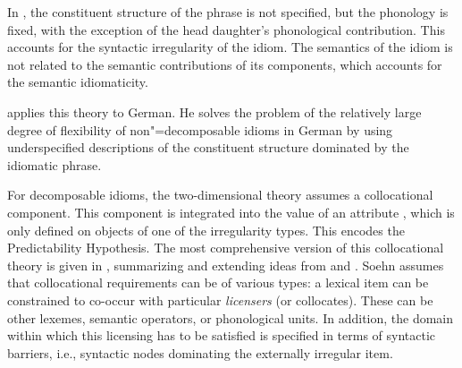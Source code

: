 \documentclass[output=paper
                ,modfonts
                ,nonflat
	        ,collection
	        ,collectionchapter
	        ,collectiontoclongg
 	        ,biblatex
                ,babelshorthands
                ,newtxmath
                ,draftmode
                ,colorlinks, citecolor=brown
]{./langsci/langscibook}
\begin{document}

In , the constituent structure of the phrase is not specified, but the phonology is fixed, with the exception of the head daughter's phonological contribution. This accounts for the syntactic irregularity of the idiom. The semantics of the idiom is not related to the semantic contributions of its components, which accounts for the semantic idiomaticity.

\citet{Soehn2006a} applies this theory to German. He solves the problem of the relatively large degree of flexibility of non"=decomposable idioms in German
by using underspecified descriptions of the constituent structure dominated by the idiomatic phrase.

For decomposable idioms, the two-dimensional theory assumes a collocational component. This component is integrated into the value of an attribute , which is only defined on  objects of one of the irregularity types. 
This encodes the Predictability Hypothesis.
%
The most comprehensive version of this collocational theory is given in \citet{Soehn:09}, summarizing and extending ideas from \citet{Soehn2006a} and \citet{richter-soehn:2006}. 
Soehn assumes that collocational requirements can be of various types: 
a lexical item can be constrained to co-occur with particular \emph{licensers} (or collocates). These can be other lexemes, semantic operators, or phonological units. In addition, the domain within which this licensing has to be satisfied is specified in terms of syntactic barriers, i.e., syntactic nodes dominating the externally irregular item.
\end{document}
